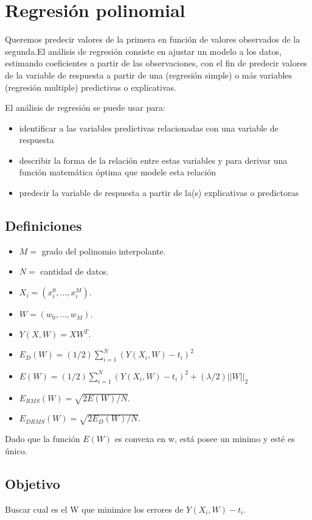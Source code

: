 

\section{Regresión polinomial}
Queremos predecir valores de la primera en función de valores observados
de la segunda.El análisis de regresión consiste en ajustar un modelo
a los datos, estimando coeficientes a partir de las observaciones, con 
el fin de predecir valores de la variable de respuesta a partir de una 
(regresión simple) o más variables (regresión multiple) predictivas o 
explicativas.\par
\indent El análisis de regresión se puede usar para:
\begin{itemize}
    \item identificar a las variables predictivas relacionadas con una variable de respuesta
    \item describir la forma de la relación entre estas variables y para derivar una función matemática óptima que modele esta relación
    \item predecir la variable de respuesta a partir de la(s) explicativas o predictoras
\end{itemize}
\subsection{Definiciones}
\begin{itemize}
    \item $M =$ grado del polinomio interpolante.
    \item $N =$ cantidad de datos.
    \item $X_{i} = (x_{i}^{0},...,x_{i}^{M}).$
    \item $ W = (w_{0},...,w_{M}).$
    \item $ Y(X,W) = XW^{T}.$
    \item $E_{D}(W) = (1/2)  \sum_{i=1}^{N} (Y(X_{i},W)-t_{i})^{2}$
    \item $E(W) = (1/2)  \sum_{i=1}^{N} (Y(X_{i},W)-t_{i})^{2} + (\lambda/2)||W||_{2}$
    \item $E_{RMS}(W) = \sqrt{2E(W)/N}$.
    \item $E_{DRMS}(W) = \sqrt{2E_{D}(W)/N}$.
\end{itemize}

Dado que la función $E(W)$ es convexa en w, está posee un
minimo y esté es único.\par
\subsection{Objetivo}
\indent Buscar cual es el W que minimice los errores de
$Y(X_{i},W)-t_{i}$.
